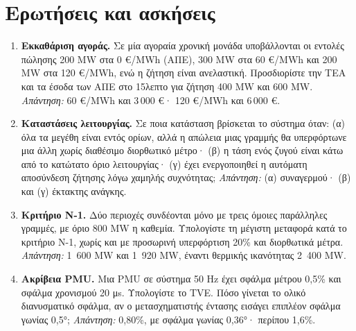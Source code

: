 \section{Ερωτήσεις και ασκήσεις}

\begin{enumerate}
\item \textbf{Εκκαθάριση αγοράς.} Σε μία αγοραία χρονική μονάδα υποβάλλονται οι εντολές
      πώλησης 200 MW στα 0 €/MWh (ΑΠΕ), 300 MW στα 60 €/MWh και 200 MW στα 120 €/MWh, ενώ η
      ζήτηση είναι ανελαστική. Προσδιορίστε την ΤΕΑ και τα έσοδα των ΑΠΕ στο 15λεπτο για
      ζήτηση 400 MW και 600 MW. \emph{Απάντηση:} 60 €/MWh και 3\,000 €· 120 €/MWh και
      6\,000 €.
\item \textbf{Καταστάσεις λειτουργίας.} Σε ποια κατάσταση βρίσκεται το σύστημα όταν:
      (α) όλα τα μεγέθη είναι εντός ορίων, αλλά η απώλεια μιας γραμμής θα υπερφόρτωνε μια
      άλλη χωρίς διαθέσιμο διορθωτικό μέτρο· (β) η τάση ενός ζυγού είναι κάτω από το κατώτατο
      όριο λειτουργίας· (γ) έχει ενεργοποιηθεί η αυτόματη αποσύνδεση ζήτησης λόγω χαμηλής
      συχνότητας; \emph{Απάντηση:} (α) συναγερμού· (β) και (γ) έκτακτης ανάγκης.
\item \textbf{Κριτήριο N-1.} Δύο περιοχές συνδέονται μόνο με τρεις όμοιες παράλληλες γραμμές,
      με όριο 800 MW η καθεμία. Υπολογίστε τη μέγιστη μεταφορά κατά το κριτήριο N-1, χωρίς
      και με προσωρινή υπερφόρτιση 20\% και διορθωτικά μέτρα. \emph{Απάντηση:} 1~600 MW και
      1~920 MW, έναντι θερμικής ικανότητας 2~400 MW.
\item \textbf{Ακρίβεια PMU.} Μια PMU σε σύστημα 50 Hz έχει σφάλμα μέτρου 0,5\% και σφάλμα
      χρονισμού 20 μs. Υπολογίστε το TVE. Πόσο γίνεται το ολικό διανυσματικό σφάλμα, αν ο
      μετασχηματιστής έντασης εισάγει επιπλέον σφάλμα γωνίας 0,5°; \emph{Απάντηση:} 0,80\%,
      με σφάλμα γωνίας 0,36°· περίπου 1,6\%.
\end{enumerate}
